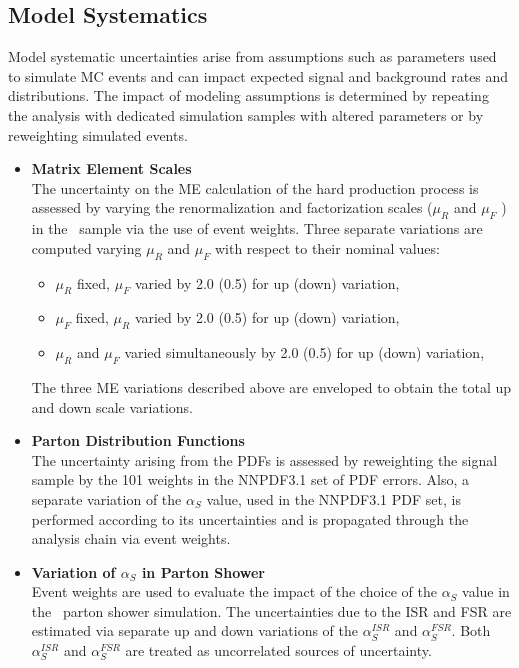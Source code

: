\subsection{Model Systematics}
\label{Model_Systematics}
Model systematic uncertainties arise from assumptions such as parameters used to simulate MC events and can impact expected signal and background rates and distributions. 
The impact of modeling assumptions is determined by repeating the analysis with dedicated simulation samples with altered parameters or by reweighting simulated events.
\begin{itemize}
    \item {\bf Matrix Element Scales} \\
    The uncertainty on the ME calculation of the hard production process is assessed by varying the renormalization and factorization scales ($\mu_R$ and $\mu_F$ ) in the \Powheg\ sample via the use of event weights. 
    Three separate variations are computed varying $\mu_R$ and $\mu_F$ with respect to their nominal values:
    \begin{itemize}
        \item $\mu_R$ fixed, $\mu_F$ varied by 2.0 (0.5) for up (down) variation,
        \item $\mu_F$ fixed, $\mu_R$ varied by 2.0 (0.5) for up (down) variation,
        \item $\mu_R$ and $\mu_F$ varied simultaneously by 2.0 (0.5) for up (down) variation,
    \end{itemize} 
    The three ME variations described above are enveloped to obtain the total up and down scale variations.
    \item {\bf Parton Distribution Functions} \\
    The uncertainty arising from the PDFs is assessed by reweighting the \ttbar signal sample by the 101 weights in the NNPDF3.1 set of PDF errors. 
    Also, a separate variation of the $\alpha_S$ value, used in the NNPDF3.1 PDF set, is performed according to its uncertainties and is propagated through the analysis chain via event weights.
    \item {\bf Variation of $\alpha_S$ in Parton Shower} \\
    Event weights are used to evaluate the impact of the choice of the $\alpha_S$ value in the \Pythia\ parton shower simulation.
    The uncertainties due to the ISR and FSR are estimated via separate up and down variations of the $\alpha_S^{ISR}$ and $\alpha_S^{FSR}$. 
    Both $\alpha_S^{ISR}$ and $\alpha_S^{FSR}$ are treated as uncorrelated sources of uncertainty.

\end{itemize}
